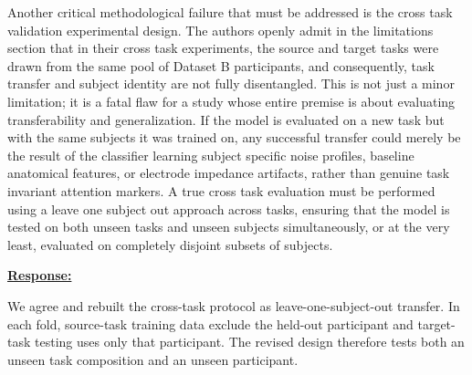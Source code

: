 \documentclass{article}
\begin{document}
\vspace{0.3cm}


\begin{cmt}{}{}

Another critical methodological failure that must be addressed is the cross task
validation experimental design. The authors openly admit in the limitations
section that in their cross task experiments, the source and target tasks were
drawn from the same pool of Dataset B participants, and consequently, task
transfer and subject identity are not fully disentangled. This is not just a
minor limitation; it is a fatal flaw for a study whose entire premise is about
evaluating transferability and generalization. If the model is evaluated on a
new task but with the same subjects it was trained on, any successful transfer
could merely be the result of the classifier learning subject specific noise
profiles, baseline anatomical features, or electrode impedance artifacts, rather
than genuine task invariant attention markers. A true cross task evaluation must
be performed using a leave one subject out approach across tasks, ensuring that
the model is tested on both unseen tasks and unseen subjects simultaneously, or
at the very least, evaluated on completely disjoint subsets of subjects.

\end{cmt}
\vspace{0.1cm}
\noindent
\underline{\textbf{Response:}}
\vspace{0.2cm}

We agree and rebuilt the cross-task protocol as leave-one-subject-out transfer.
In each fold, source-task training data exclude the held-out participant and
target-task testing uses only that participant. The revised design therefore
tests both an unseen task composition and an unseen participant.

\vspace{0.3cm}
\end{document}
